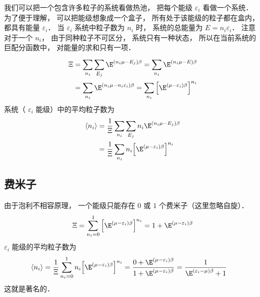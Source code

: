 
我们可以把一个包含许多粒子的系统看做热池， 把每个能级 ${\varepsilon_i}$ 看做一个系统． 为了便于理解， 可以把能级想象成一个盒子， 所有处于该能级的粒子都在盒内， 都具有能量 ${\varepsilon_i}$．  当 ${\varepsilon_i}$ 系统中粒子数为 ${n_i}$ 时， 系统的总能量为 $E = {n_i}{\varepsilon_i}$．  注意对于一个 ${n_i}$，  由于同种粒子不可区分， 系统只有一种状态， 所以在当前系统的巨配分函数中， 对能量的求和只有一项．
\begin{equation}
  \begin{aligned}
  \Xi & = \sum\limits_{n_i}^{} {\sum\limits_{E_j}^{} {\E^{\left( {{n_i}\mu  - {E_j}} \right)\beta }} }  = \sum\limits_{n_i}^{} {\E^{\left( {{n_i}\mu  - E} \right)\beta }}  \\
  & = \sum\limits_{n_i}^{} {\E^{\left( {{n_i}\mu  - {n_i}{\varepsilon_i}} \right)\beta }}  = \sum\limits_{n_i}^{} {{\left[ {\E^{\left( {\mu  - {\varepsilon_i}} \right)\beta }} \right]}^{n_i}}
  \end{aligned}
\end{equation}
系统（ ${\varepsilon_i}$ 能级）中的平均粒子数为
\begin{equation}
\begin{aligned}
  \left\langle {n_i} \right\rangle  & = \frac{1}{\Xi }\sum\limits_{n_i}^{} {\sum\limits_{E_j}^{} {{n_i}{\E^{\left( {{n_i}\mu  - {E_j}} \right)\beta }}} }  \\
  & = \frac{1}{\Xi }\sum\limits_{n_i}^{} {{n_i}{{\left[ {\E^{\left( {\mu  - {\varepsilon_i}} \right)\beta }} \right]}^{n_i}}}
\end{aligned}
\end{equation}
\subsection{费米子}
由于泡利不相容原理， 一个能级只能存在 $0$ 或 $1$ 个费米子（这里忽略自旋）．
\begin{equation}
  \Xi  = \sum\limits_{{n_i} = 0}^1 {{\left[ {\E^{\left( {\mu  - {\varepsilon_i}} \right)\beta }} \right]}^{n_i}}  = 1 + {\E^{\left( {\mu  - {\varepsilon_i}} \right)\beta }}
\end{equation}
 ${\varepsilon_i}$ 能级的平均粒子数为
\begin{equation}
\begin{aligned}
\left\langle {n_i} \right\rangle & = \frac{1}{\Xi }\sum\limits_{{n_i} = 0}^1 {{n_i}{{\left[ {\E^{\left( {\mu  - {\varepsilon_i}} \right)\beta }} \right]}^{n_i}}} = \frac{0 + {\E^{\left( {\mu  - {\varepsilon_i}} \right)\beta }}}{1 + {\E^{\left( {\mu  - {\varepsilon_i}} \right)\beta }}}  = \frac{1}{{\E^{\left( {{\varepsilon_i} - \mu } \right)\beta }} + 1}
\end{aligned}
\end{equation}
  这就是著名的．
